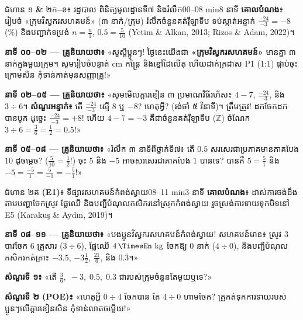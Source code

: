 \documentclass[a4paper,12pt]{article}
\newcommand{\en}[1]{{\TimesEn #1}}
\newcommand{\enbf}[1]{{\TimesEn\textbf{#1}}}
\newcommand{\unit}[1]{\,\text{\en{#1}}}
\begin{document}
\begin{phasebox}{ជំហាន ១ \enbf{\&} ២ក\enbf{–}ខ៖ រដ្ឋបាល ពិនិត្យមូលដ្ឋានទី៧ និងរំលឹក}{00–08 min}{8 នាទី}
\textbf{គោលបំណង}៖ រៀបចំ «ក្រុមវិស្វករសហគមន៍» (៣ នាក់/ក្រុម) រំលឹកចំនួនគត់រ៉ឺឡាទីប ទប់ស្កាត់អន្ទាក់ $\frac{-24}{-3}=-8$ (\en{52.1\%}) និងបញ្ជាក់ទម្រង់ $n=\frac{n}{1}$, $0.5=\frac{5}{10}$ \en{(Yetim \& Alkan, 2013; Rizos \& Adam, 2022)}។
\end{phasebox}
\begin{scriptbox}
  \textbf{នាទី ០០–០២ — គ្រូនិយាយថា៖} «សួស្ដីប្អូនៗ! ថ្ងៃនេះយើងជា \textbf{«ក្រុមវិស្វករសហគមន៍»} មានគ្នា ៣ នាក់ក្នុងមួយក្រុម។ សូមរៀបចំបន្ទាត់ \en{cm} កន្ត្រៃ និងខ្មៅដៃលើតុ ហើយដាក់ក្រដាស \en{P1 (1:1)} ផ្កាប់ចុះក្រោមសិន កុំទាន់កាត់មុនសញ្ញាគ្រូ!»\par\vspace{2pt}
  \textbf{នាទី ០២–០៥ — គ្រូនិយាយថា៖} «សូមមើលក្ដារខៀន ៣ ប្រមាណវិធីរហ័ស៖ $4-7$, $\frac{-24}{-3}$, និង $3\div 6$។ \textbf{សំណួរអន្ទាក់៖} តើ $\frac{-24}{-3}$ ស្មើ $8$ ឬ $-8$? ហេតុអ្វី? (រង់ចាំ ៥ វិនាទី)។ ត្រឹមត្រូវ! ដកចែកដកបានបូក ដូច្នេះ $\frac{-24}{-3}=+8$! ហើយ $4-7=-3$ គឺជាចំនួនគត់រ៉ឺឡាទីប ($\mathbb{Z}$) ចំណែក $3\div 6=\frac{3}{6}=\frac{1}{2}=0.5$!»\par\vspace{2pt}
  \textbf{នាទី ០៥–០៨ — គ្រូនិយាយថា៖} «រំលឹក ៣ នាទីពីថ្នាក់ទី៧៖ តើ $0.5$ សរសេរជាប្រភាគមានភាគបែង $10$ ដូចម្ដេច? ($\frac{5}{10}=\frac{1}{2}$!) ចុះ $5$ និង $-5$ អាចសរសេរជាភាគបែង $1$ បានទេ? បានគឺ $5=\frac{5}{1}$ និង $-5=\frac{-5}{1}=\frac{5}{-1}=-\frac{5}{1}$!»
\end{scriptbox}

\begin{phasebox}{ជំហាន ២គ \enbf{(E1)}៖ ទីផ្សារសហគមន៍កំពង់ស្វាយ}{08–11 min}{3 នាទី}
\textbf{គោលបំណង}៖ ដាស់ការចង់ដឹងតាមបញ្ហាចែកស្រូវ ផ្លែឈើ និងបញ្ជីបំណុលកសិករនៅស្រុកកំពង់ស្វាយ រួចស្រង់ការទាយទុកបិទនៅ \en{E5} \en{(Karakuş \& Aydın, 2019)}។
\end{phasebox}
\begin{scriptbox}
  \textbf{នាទី ០៨–១១ — គ្រូនិយាយថា៖} «បងប្អូនវិស្វករសហគមន៍កំពង់ស្វាយ! សហគមន៍មាន៖ ស្រូវ $3$ បាវចែក $6$ គ្រួសារ ($3\div 6$), ផ្លែឈើ $4\unit{kg}$ ចែកឱ្យ $0$ នាក់ ($4\div 0$), និងបញ្ជីបំណុលកសិករកត់ត្រា៖ $-3.5$, $-3\frac{1}{2}$, $\frac{21}{6}$, និង $0.\overline{3}$។»\par\vspace{2pt}
  \textbf{សំណួរទី ១៖} «តើ $\frac{3}{6},\; -3,\; 0.5,\; 0.\overline{3}$ ជារបស់ក្រុមចំនួនតែមួយឬទេ?»\par\vspace{2pt}
  \textbf{សំណួរទី ២ (\en{POE})៖} «ហេតុអ្វី $0\div 4$ ចែកបាន តែ $4\div 0$ ហាមចែក? គ្រូកត់ទុកការទាយរបស់ប្អូនៗលើក្ដារខៀនសិន កុំទាន់លាតចម្លើយ!»
\end{scriptbox}
\end{document}
